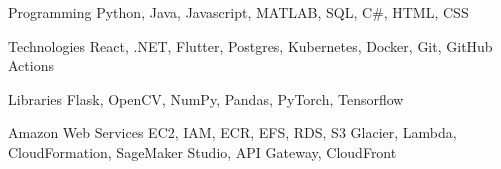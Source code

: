 
\begin{cvskills}
  \cvskill 
    {Programming}
    {Python, Java, Javascript, MATLAB, SQL, C\#, HTML, CSS}

    \cvskill 
    {Technologies}
    {React, .NET, Flutter, Postgres, Kubernetes, Docker, Git, GitHub Actions}

    \cvskill
    {Libraries}
    {Flask, OpenCV, NumPy, Pandas, PyTorch, Tensorflow}

    \cvskill 
    {Amazon Web Services}
    {EC2, IAM, ECR, EFS, RDS, S3 Glacier, Lambda, CloudFormation, SageMaker Studio, API Gateway, CloudFront}

\end{cvskills}
